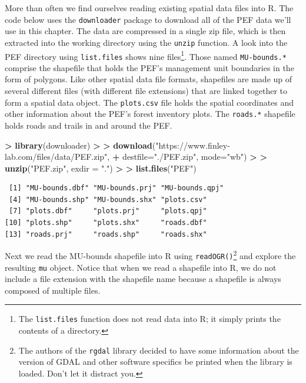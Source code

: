 \documentclass[
]{krantz}
\makeatletter
\newenvironment{Shaded}{\begin{snugshade}}{\end{snugshade}}
\newcommand{\DataTypeTok}[1]{\textcolor[rgb]{0.27,0.27,0.27}{#1}}
\newcommand{\ErrorTok}[1]{\textcolor[rgb]{0.14,0.14,0.14}{\textbf{#1}}}
\newcommand{\KeywordTok}[1]{\textcolor[rgb]{0.27,0.27,0.27}{\textbf{#1}}}
\newcommand{\NormalTok}[1]{#1}
\newcommand{\OperatorTok}[1]{\textcolor[rgb]{0.43,0.43,0.43}{\textbf{#1}}}
\newcommand{\StringTok}[1]{\textcolor[rgb]{0.5,0.5,0.5}{#1}}
\newenvironment{kframe}{%
\medskip{}
\setlength{\fboxsep}{.8em}
 \def\at@end@of@kframe{}%
 \ifinner\ifhmode%
  \def\at@end@of@kframe{\end{minipage}}%
  \begin{minipage}{\columnwidth}%
 \fi\fi%
 \def\FrameCommand##1{\hskip\@totalleftmargin \hskip-\fboxsep
 \colorbox{shadecolor}{##1}\hskip-\fboxsep
     \hskip-\linewidth \hskip-\@totalleftmargin \hskip\columnwidth}%
 \MakeFramed {\advance\hsize-\width
   \@totalleftmargin\z@ \linewidth\hsize
   \@setminipage}}%
 {\par\unskip\endMakeFramed%
 \at@end@of@kframe}
\renewenvironment{Shaded}{\begin{kframe}}{\end{kframe}}
\makeatother
\begin{document}
More than often we find ourselves reading existing spatial data files into R. The code below uses the \texttt{downloader} package to download all of the PEF data we'll use in this chapter. The data are compressed in a single zip file, which is then extracted into the working directory using the \texttt{unzip} function. A look into the PEF directory using \texttt{list.files} shows nine files\footnote{The \texttt{list.files} function does not read data into R; it simply prints the contents of a directory.}. Those named \texttt{MU-bounds.*} comprise the shapefile that holds the PEF's management unit boundaries in the form of polygons. Like other spatial data file formats, shapefiles are made up of several different files (with different file extensions) that are linked together to form a spatial data object. The \texttt{plots.csv} file holds the spatial coordinates and other information about the PEF's forest inventory plots. The \texttt{roads.*} shapefile holds roads and trails in and around the PEF.

\begin{Shaded}
\begin{Highlighting}[]
\OperatorTok{\textgreater{}}\StringTok{ }\KeywordTok{library}\NormalTok{(downloader)}
\OperatorTok{\textgreater{}}\StringTok{ }
\ErrorTok{\textgreater{}}\StringTok{ }\KeywordTok{download}\NormalTok{(}\StringTok{"https://www.finley{-}lab.com/files/data/PEF.zip"}\NormalTok{, }
\OperatorTok{+}\StringTok{          }\DataTypeTok{destfile=}\StringTok{"./PEF.zip"}\NormalTok{, }\DataTypeTok{mode=}\StringTok{"wb"}\NormalTok{) }
\OperatorTok{\textgreater{}}\StringTok{ }
\ErrorTok{\textgreater{}}\StringTok{ }\KeywordTok{unzip}\NormalTok{(}\StringTok{"PEF.zip"}\NormalTok{, }\DataTypeTok{exdir =} \StringTok{"."}\NormalTok{)}
\OperatorTok{\textgreater{}}\StringTok{ }
\ErrorTok{\textgreater{}}\StringTok{ }\KeywordTok{list.files}\NormalTok{(}\StringTok{"PEF"}\NormalTok{)}
\end{Highlighting}
\end{Shaded}

\begin{verbatim}
 [1] "MU-bounds.dbf" "MU-bounds.prj" "MU-bounds.qpj"
 [4] "MU-bounds.shp" "MU-bounds.shx" "plots.csv"    
 [7] "plots.dbf"     "plots.prj"     "plots.qpj"    
[10] "plots.shp"     "plots.shx"     "roads.dbf"    
[13] "roads.prj"     "roads.shp"     "roads.shx"    
\end{verbatim}

Next we read the MU-bounds shapefile into R using \texttt{readOGR()}\footnote{The authors of the \texttt{rgdal} library decided to have some information about the version of GDAL and other software specifics be printed when the library is loaded. Don't let it distract you.} and explore the resulting \texttt{mu} object. Notice that when we read a shapefile into R, we do not include a file extension with the shapefile name because a shapefile is always composed of multiple files.
\end{document}
